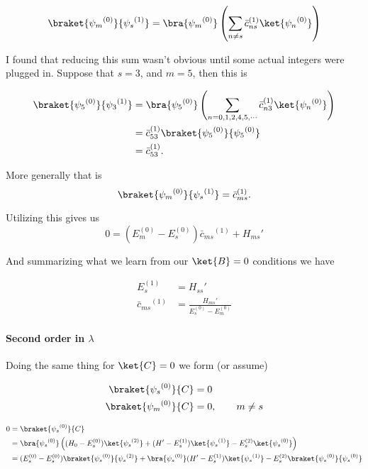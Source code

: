 \begin{align*}
\braket{{\psi_m}^{(0)}}{{\psi_s}^{(1)}} 
&=
\bra{{\psi_m}^{(0)}}
\left(
\sum_{n \ne s} {\bar{c}_{ns}}^{(1)} \ket{{\psi_n}^{(0)}}
\right) \\
\end{align*}

I found that reducing this sum wasn't obvious until some actual integers were plugged in.  Suppose that $s = 3$, and $m = 5$, then this is

\begin{align*}
\braket{{\psi_5}^{(0)}}{{\psi_3}^{(1)}} 
&=
\bra{{\psi_5}^{(0)}}
\left(
\sum_{n = 0, 1, 2, 4, 5, \cdots} {\bar{c}_{n3}}^{(1)} \ket{{\psi_n}^{(0)}}
\right) \\
&=
{\bar{c}_{53}}^{(1)} \braket{{\psi_5}^{(0)}}{{\psi_5}^{(0)}} \\
&=
{\bar{c}_{53}}^{(1)}.
\end{align*}

More generally that is
\begin{equation}\label{eqn:qmTwoL4:580}
\braket{{\psi_m}^{(0)}}{{\psi_s}^{(1)}} 
=
{\bar{c}_{ms}}^{(1)}.
\end{equation}

Utilizing this gives us
\begin{equation}\label{eqn:qmTwoL4:600}
0 = 
( E_m^{(0)} - E_s^{(0)}) 
{\bar{c}_{ms}}^{(1)}
+
{H_{ms}}' 
\end{equation}

And summarizing what we learn from our $\ket{B} = 0$ conditions we have

\begin{align}\label{eqn:qmTwoL4:620}
E_s^{(1)} &= {H_{ss}}' \\
{\bar{c}_{ms}}^{(1)}
&=
\frac{{H_{ms}}' }
{ E_s^{(0)} - E_m^{(0)} }
\end{align}

\paragraph{Second order in $\lambda$}

Doing the same thing for $\ket{C} = 0$ we form (or assume)

\begin{align}\label{eqn:qmTwoL4:640}
\braket{{\psi_s}^{(0)}}{C} &= 0 \\
\braket{{\psi_m}^{(0)}}{C} &= 0, \qquad m \ne s
\end{align}

\begin{align*}
0 
&= \braket{{\psi_s}^{(0)}}{C}  \\
&=
\bra{{\psi_s}^{(0)}}
\left(
(H_0 - E_s^{(0)}) \ket{{\psi_s}^{(2)}} 
+(H' - E_s^{(1)}) \ket{{\psi_s}^{(1)}} 
-E_s^{(2)} \ket{{\psi_s}^{(0)}}  
\right) \\
&=
(E_s^{(0)} - E_s^{(0)}) 
\braket{{\psi_s}^{(0)}}{{\psi_s}^{(2)}} 
+
\bra{{\psi_s}^{(0)}}
(H' - E_s^{(1)}) \ket{{\psi_s}^{(1)}} 
-E_s^{(2)} \braket{{\psi_s}^{(0)}}{{\psi_s}^{(0)}} 
\end{align*}

